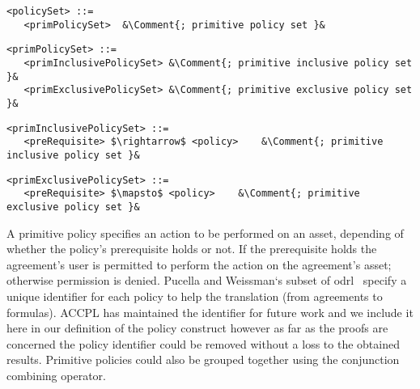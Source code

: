 \newcommand*{\Comment}[1]{\hfill\makebox[7.0cm][l]{#1}}%
\lstset{mathescape, language=AST, escapechar=\&}  
\begin{lstlisting}[frame=single, caption={policySet},label={lst:policySetast}]
<policySet> ::=  
   <primPolicySet>	&\Comment{; primitive policy set }&
\end{lstlisting}

\lstset{mathescape, language=AST, escapechar=\&}  
\begin{lstlisting}[frame=single, caption={primPolicySet},label={lst:primPolicySetast}]
<primPolicySet> ::=  
   <primInclusivePolicySet>	&\Comment{; primitive inclusive policy set }&
   <primExclusivePolicySet>	&\Comment{; primitive exclusive policy set }&
\end{lstlisting}

\lstset{mathescape, language=AST, escapechar=\&}  
\begin{lstlisting}[frame=single, caption={primInclusivePolicySet},label={lst:primInclusivePolicySetast}]
<primInclusivePolicySet> ::=  
   <preRequisite> $\rightarrow$ <policy>	&\Comment{; primitive inclusive policy set }&
\end{lstlisting}

\lstset{mathescape, language=AST, escapechar=\&}  
\begin{lstlisting}[frame=single, caption={primExclusivePolicySet},label={lst:primExclusivePolicySetast}]
<primExclusivePolicySet> ::=  
   <preRequisite> $\mapsto$ <policy>	&\Comment{; primitive exclusive policy set }&
\end{lstlisting}

A primitive policy specifies an action to be performed on an asset, depending of whether the policy's prerequisite holds or not. If the prerequisite holds the agreement's user is permitted to perform the action on the agreement's asset; otherwise permission is denied. Pucella and Weissman`s subset of \ac{odrl}~\cite{pucella2006} specify a unique identifier for each policy to help the translation (from agreements to formulas). \ac{ACCPL} has maintained the identifier for future work and we include it here in our definition of the policy construct however as far as the proofs are concerned the policy identifier could be removed without a loss to the obtained results. Primitive policies could also be grouped together using the conjunction combining operator.


